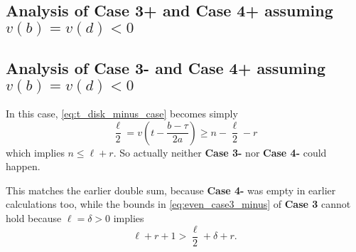 \subsection{Analysis of Case 3\ts+ and Case 4\ts+ assuming $v(b) = v(d) < 0$}

\subsection{Analysis of Case 3\ts- and Case 4\ts+ assuming $v(b) = v(d) < 0$}
In this case, \eqref{eq:t_disk_minus_case} becomes simply
\[ \frac{\ell}{2} = v\left( t - \frac{b-\tau}{2a} \right) \ge n - \frac{\ell}{2} - r \]
which implies $n \le \ell + r$.
So actually neither \textbf{Case 3\ts-} nor \textbf{Case 4\ts-} could happen.

This matches the earlier double sum, because \textbf{Case 4\ts-}
was empty in earlier calculations too,
while the bounds in \eqref{eq:even_case3_minus} of \textbf{Case 3\ts{-}}
cannot hold because $\ell = \delta > 0$ implies
\[ \ell + r + 1 > \frac{\ell}{2} + \delta + r. \]
